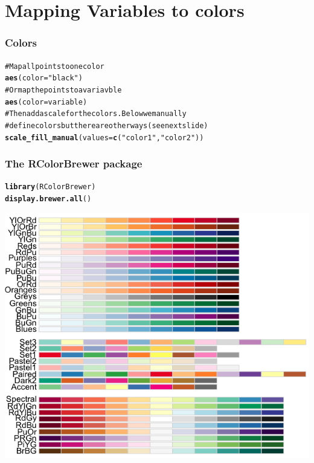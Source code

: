 \documentclass{beamer}\usepackage{graphicx, color}
\makeatletter
\newcommand{\hlfunctioncall}[1]{\textcolor[rgb]{0.501960784313725,0,0.329411764705882}{\textbf{#1}}}%
\newcommand{\hlstring}[1]{\textcolor[rgb]{0.6,0.6,1}{#1}}%
\newcommand{\hlcomment}[1]{\textcolor[rgb]{0.180392156862745,0.6,0.341176470588235}{#1}}%
\newenvironment{kframe}{%
 \def\at@end@of@kframe{}%
 \ifinner\ifhmode%
  \def\at@end@of@kframe{\end{minipage}}%
  \begin{minipage}{\columnwidth}%
 \fi\fi%
 \def\FrameCommand##1{\hskip\@totalleftmargin \hskip-\fboxsep
 \colorbox{shadecolor}{##1}\hskip-\fboxsep
     \hskip-\linewidth \hskip-\@totalleftmargin \hskip\columnwidth}%
 \MakeFramed {\advance\hsize-\width
   \@totalleftmargin\z@ \linewidth\hsize
   \@setminipage}}%
 {\par\unskip\endMakeFramed%
 \at@end@of@kframe}
\newenvironment{knitrout}{}{} %
\makeatother
\begin{document}
\section*{Mapping Variables to colors}
\frame{\sectionpage}


\begin{frame}[fragile]
\frametitle{Colors}
\begin{knitrout}\footnotesize
{}\color{fgcolor}\begin{kframe}
\begin{alltt}
\hlcomment{# Map all points to one color}
\hlfunctioncall{aes}(color = \hlstring{"black"})
\hlcomment{# Or map the points to a variavble}
\hlfunctioncall{aes}(color = variable)
\hlcomment{# Then add a scale for the colors.  Below we manually}
\hlcomment{# define colors but there are other ways (see next slide)}
\hlfunctioncall{scale_fill_manual}(values = \hlfunctioncall{c}(\hlstring{"color1"}, \hlstring{"color2"}))
\end{alltt}
\end{kframe}
\end{knitrout}

\end{frame}


\begin{frame}[fragile]
\frametitle{The RColorBrewer package}
\begin{knitrout}\footnotesize
{}\color{fgcolor}\begin{kframe}
\begin{alltt}
\hlfunctioncall{library}(RColorBrewer)
\hlfunctioncall{display.brewer.all}()
\end{alltt}
\end{kframe}
\end{knitrout}

\includegraphics[scale=0.25]{images/color_palette.png}
\end{frame}
\end{document}
